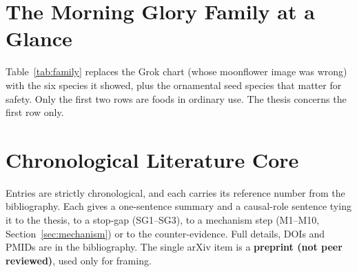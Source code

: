\documentclass[11pt,a4paper]{article}
\begin{document}
\section{The Morning Glory Family at a Glance}
\label{sec:family}

Table~\ref{tab:family} replaces the Grok chart (whose moonflower image was wrong) with the six species it showed, plus the ornamental seed species that matter for safety. Only the first two rows are foods in ordinary use. The thesis concerns the first row only.

\begin{table}[H]
\centering\small
\caption{Morning glories re-tabulated with an edible-versus-toxic marker. Food status is common usage, not a safety endorsement. A grey marker means only that the species is not evaluated as food here.}
\label{tab:family}

\end{table}

\section{Chronological Literature Core}
\label{sec:literature}

Entries are strictly chronological, and each carries its reference number from the bibliography. Each gives a one-sentence summary and a causal-role sentence tying it to the thesis, to a stop-gap (SG1--SG3), to a mechanism step (M1--M10, Section~\ref{sec:mechanism}) or to the counter-evidence. Full details, DOIs and PMIDs are in the bibliography. The single arXiv item is a \textbf{preprint (not peer reviewed)}, used only for framing.
\end{document}
